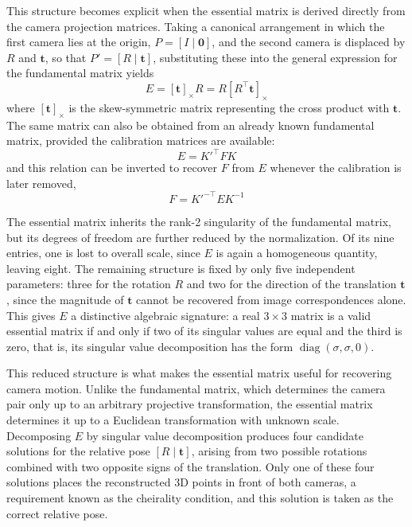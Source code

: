 This structure becomes explicit when the essential matrix is derived directly from the camera projection matrices. Taking a canonical arrangement in which the first camera lies at the origin, $P = [I \mid \mathbf{0}]$, and the second camera is displaced by $R$ and $\mathbf{t}$, so that $P' = [R \mid \mathbf{t}]$, substituting these into the general expression for the fundamental matrix yields
\begin{equation}
    E = [\mathbf{t}]_\times R = R [R^\top \mathbf{t}]_\times
\end{equation}
where $[\mathbf{t}]_\times$ is the skew-symmetric matrix representing the cross product with $\mathbf{t}$. The same matrix can also be obtained from an already known fundamental matrix, provided the calibration matrices are available:
\begin{equation}
    E = K'^\top F K
\end{equation}
and this relation can be inverted to recover $F$ from $E$ whenever the calibration is later removed,
\begin{equation}
    F = K'^{-\top} E K^{-1}
\end{equation}

The essential matrix inherits the rank-2 singularity of the fundamental matrix, but its degrees of freedom are further reduced by the normalization. Of its nine entries, one is lost to overall scale, since $E$ is again a homogeneous quantity, leaving eight. The remaining structure is fixed by only five independent parameters: three for the rotation $R$ and two for the direction of the translation $\mathbf{t}$, since the magnitude of $\mathbf{t}$ cannot be recovered from image correspondences alone. This gives $E$ a distinctive algebraic signature: a real $3 \times 3$ matrix is a valid essential matrix if and only if two of its singular values are equal and the third is zero, that is, its singular value decomposition has the form $\operatorname{diag}(\sigma, \sigma, 0)$.

This reduced structure is what makes the essential matrix useful for recovering camera motion. Unlike the fundamental matrix, which determines the camera pair only up to an arbitrary projective transformation, the essential matrix determines it up to a Euclidean transformation with unknown scale. Decomposing $E$ by singular value decomposition produces four candidate solutions for the relative pose $[R \mid \mathbf{t}]$, arising from two possible rotations combined with two opposite signs of the translation. Only one of these four solutions places the reconstructed 3D points in front of both cameras, a requirement known as the cheirality condition, and this solution is taken as the correct relative pose.

